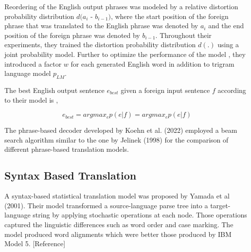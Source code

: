 Reordering of the English output phrases was modeled by a relative distortion probability distribution $d(a_i$ - $b_{i-1})$, where the start position of the foreign phrase that was translated to the English phrase was denoted by $a_i$ and the end position of the foreign phrase was denoted by $b_{i-1}$. Throughout their experiments, they trained the distortion probability distribution $d (.)$ using a joint probability model. Further to optimize the performance of the model , they introduced a factor $w$ for each generated English word in addition to trigram language model $p_{LM}$. 

The best English output sentence $e_{best}$ given a foreign input sentence $f$ according to their model is ,

$$
 e_{best}= argmax_ep(e|f)
         = argmax_ep(e|f)
$$




The phrase-based decoder developed by Koehn et al. (2022) employed a beam search algorithm similar to the one by Jelinek (1998)  for the comparison of different phrase-based translation models.
\subsection{Syntax Based Translation}
A syntax-based statistical translation model was proposed by Yamada et al (2001). Their model transformed a source-language parse tree into a target-language string by applying stochastic operations at each node. Those operations captured the linguistic differences such as word order and case marking. The model produced word alignments which were better those produced by IBM Model 5. [Reference]

